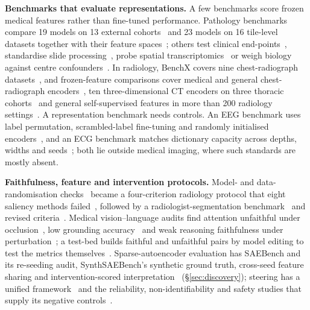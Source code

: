 \textbf{Benchmarks that evaluate representations.} A few benchmarks score frozen medical features rather
than fine-tuned performance. Pathology benchmarks compare 19 models on 13 external
cohorts~\cite{neidlinger2025benchmark} and 23 models on 16 tile-level datasets together with their feature
spaces~\cite{marza2025thunder}; others test clinical end-points~\cite{campanella2024clinical}, standardise
slide processing~\cite{zhang2025pathobench}, probe spatial transcriptomics~\cite{jaume2024hest} or weigh
biology against centre confounders~\cite{dejong2025current}. In radiology, BenchX covers nine
chest-radiograph datasets~\cite{zhou2024benchx}, and frozen-feature comparisons cover medical and general
chest-radiograph encoders~\cite{li2025featurequality}, ten three-dimensional CT encoders on three thoracic
cohorts~\cite{chevli2026frozenct} and general self-supervised features in more than 200 radiology
settings~\cite{baharoon2023dinov2}. A representation benchmark needs controls. An EEG benchmark uses
label permutation, scrambled-label fine-tuning and randomly initialised encoders~\cite{zare2026eeg}, and
an ECG benchmark matches dictionary capacity across depths, widths and
seeds~\cite{duan2026ecginterpbench}; both lie outside medical imaging, where such standards are mostly
absent.

\textbf{Faithfulness, feature and intervention protocols.} Model- and data-randomisation
checks~\cite{adebayo2018sanity} became a four-criterion radiology protocol that eight saliency methods
failed~\cite{arun2021trustworthiness}, followed by a radiologist-segmentation
benchmark~\cite{saporta2022benchmarking} and revised criteria~\cite{zhang2023revisiting}. Medical
vision--language audits find attention unfaithful under occlusion~\cite{sadanandan2026attention}, low
grounding accuracy~\cite{chen2026grounding} and weak reasoning faithfulness under
perturbation~\cite{moll2025faithfulness}; a test-bed builds faithful and unfaithful pairs by model
editing to test the metrics themselves~\cite{zaman2025causal}. Sparse-autoencoder evaluation has
SAEBench and its re-seeding audit, SynthSAEBench's synthetic ground truth, cross-seed feature sharing and
intervention-scored
interpretation~\cite{karvonen2025saebench,chanin2026are,chanin2026synthsaebench,paulo2025sparse,paulo2024automatically}
(\S\ref{sec:discovery}); steering has a unified framework~\cite{im2025unifiedsteering} and the
reliability, non-identifiability and safety studies that supply its negative
controls~\cite{tan2024steeringreliability,venkatesh2026nonident,korznikov2025the}.

